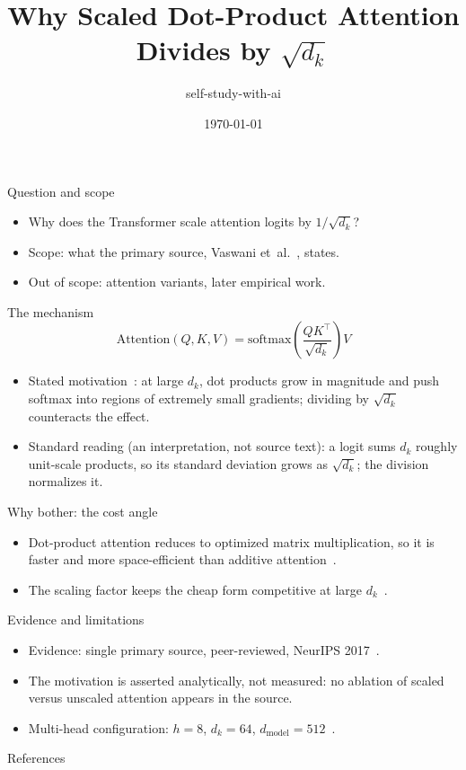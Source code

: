 \documentclass[aspectratio=169,11pt]{beamer}
\title[SDPA scaling]{Why Scaled Dot-Product Attention Divides by $\sqrt{d_k}$}
\author{self-study-with-ai}
\date{\today}
\begin{document}
\begin{frame}
  \titlepage
\end{frame}

\begin{frame}{Question and scope}
  \begin{itemize}
    \item Why does the Transformer scale attention logits by $1/\sqrt{d_k}$?
    \item Scope: what the primary source, Vaswani et~al.~\citep{vaswani2017attention}, states.
    \item Out of scope: attention variants, later empirical work.
  \end{itemize}
\end{frame}

\begin{frame}{The mechanism}
  \begin{equation*}
    \mathrm{Attention}(Q, K, V)
      = \mathrm{softmax}\!\left(\frac{QK^\top}{\sqrt{d_k}}\right) V
  \end{equation*}
  \begin{itemize}
    \item Stated motivation~\citep{vaswani2017attention}: at large $d_k$, dot
      products grow in magnitude and push softmax into regions of extremely
      small gradients; dividing by $\sqrt{d_k}$ counteracts the effect.
    \item Standard reading (an interpretation, not source text): a logit sums
      $d_k$ roughly unit-scale products, so its standard deviation grows as
      $\sqrt{d_k}$; the division normalizes it.
  \end{itemize}
\end{frame}

\begin{frame}{Why bother: the cost angle}
  \begin{itemize}
    \item Dot-product attention reduces to optimized matrix multiplication, so
      it is faster and more space-efficient than additive
      attention~\citep{vaswani2017attention}.
    \item The scaling factor keeps the cheap form competitive at large
      $d_k$~\citep{vaswani2017attention}.
  \end{itemize}
\end{frame}

\begin{frame}{Evidence and limitations}
  \begin{itemize}
    \item Evidence: single primary source, peer-reviewed, NeurIPS
      2017~\citep{vaswani2017attention}.
    \item The motivation is asserted analytically, not measured: no ablation of
      scaled versus unscaled attention appears in the source.
    \item Multi-head configuration: $h = 8$, $d_k = 64$, $d_{\mathrm{model}} =
      512$~\citep{vaswani2017attention}.
  \end{itemize}
\end{frame}

\begin{frame}{References}
  \footnotesize
  
  
\end{frame}
\end{document}
